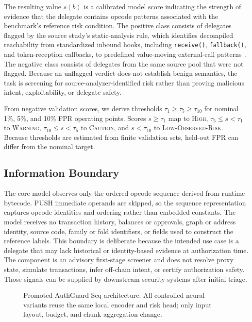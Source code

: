 \documentclass[conference]{IEEEtran}
\newcommand{\code}[1]{\texttt{#1}}
\begin{document}
The resulting value $s(b)$ is a calibrated model score indicating the strength of evidence that the delegate contains opcode patterns associated with the benchmark's reference risk condition. The positive class consists of delegates flagged by the source study's static-analysis rule, which identifies decompiled reachability from standardized inbound hooks, including \code{receive()}, \code{fallback()}, and token-reception callbacks, to predefined value-moving external-call patterns~\cite{huang2026darkside}. The negative class consists of delegates from the same source pool that were not flagged. Because an unflagged verdict does not establish benign semantics, the task is screening for source-analyzer-identified risk rather than proving malicious intent, exploitability, or delegate safety.

From negative validation scores, we derive thresholds $\tau_1\geq\tau_5\geq\tau_{10}$ for nominal 1\%, 5\%, and 10\% FPR operating points. Scores $s\geq\tau_1$ map to \textsc{High}, $\tau_5\leq s<\tau_1$ to \textsc{Warning}, $\tau_{10}\leq s<\tau_5$ to \textsc{Caution}, and $s<\tau_{10}$ to \textsc{Low-Observed-Risk}. Because thresholds are estimated from finite validation sets, held-out FPR can differ from the nominal target.

\subsection{Information Boundary}

The core model observes only the ordered opcode sequence derived from runtime bytecode. PUSH immediate operands are skipped, so the sequence representation captures opcode identities and ordering rather than embedded constants. The model receives no transaction history, balances or approvals, graph or address identity, source code, family or fold identifiers, or fields used to construct the reference labels. This boundary is deliberate because the intended use case is a delegate that may lack historical or identity-based evidence at authorization time. The component is an advisory first-stage screener and does not resolve proxy state, simulate transactions, infer off-chain intent, or certify authorization safety. Those signals can be supplied by downstream security systems after initial triage.


\begin{figure}[t]
\centering
\resizebox{0.98\textwidth}{!}{}
\caption{Promoted AuthGuard-Seq architecture. All controlled neural variants reuse the same local encoder and risk head; only input layout, budget, and chunk aggregation change.}
\label{fig:encoder}
\end{figure}
\end{document}

